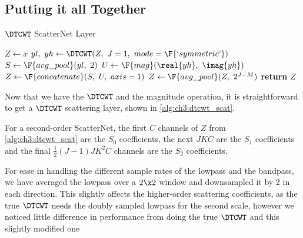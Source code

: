 \subsection{Putting it all Together}\label{sec:ch3:combining}

\begin{algorithm}[tb]
  \caption{$\DTCWT$ ScatterNet Layer}
  \label{alg:ch3:dtcwt_scat}
\begin{algorithmic}[1]
\State $Z \gets x$
  \State $yl,\ yh \gets \DTCWT(Z,\ J=1,\ mode=\F{`symmetric \textrm'})$
  \State $S \gets \F{avg\_pool}(yl,\ 2)$
  \State $U \gets \F{mag}(\real{yh},\ \imag{yh})$
  \State $Z \gets \F{concatenate}(S,\ U,\ axis=1)$ 
\EndFor
{}
\State $Z \gets \F{avg\_pool}(Z,\ 2^{J-M})$
\EndIf
\State \textbf{return} $Z$
\EndFunction
\end{algorithmic}
\end{algorithm}
Now that we have the $\DTCWT$ and the magnitude operation, it is straightforward
to get a $\DTCWT$ scattering layer, shown in \autoref{alg:ch3:dtcwt_scat}.

For a second-order ScatterNet, the first $C$ channels of $Z$ from
\autoref{alg:ch3:dtcwt_scat} are the $S_0$ coefficients, the next $JKC$ are the
$S_1$ coefficients and the final $\frac{1}{2}(J-1)JK^2C$ channels are the
$S_2$ coefficients.

For ease in handling the different sample rates of the lowpass and the
bandpass, we have averaged the lowpass over a $2\x 2$ window and downsampled it
by 2 in each direction. This slightly
affects the higher-order scattering coefficients, as the true $\DTCWT$ needs the doubly
sampled lowpass for the second scale, however we noticed little difference in
performance from doing the true $\DTCWT$ and this slightly modified one

